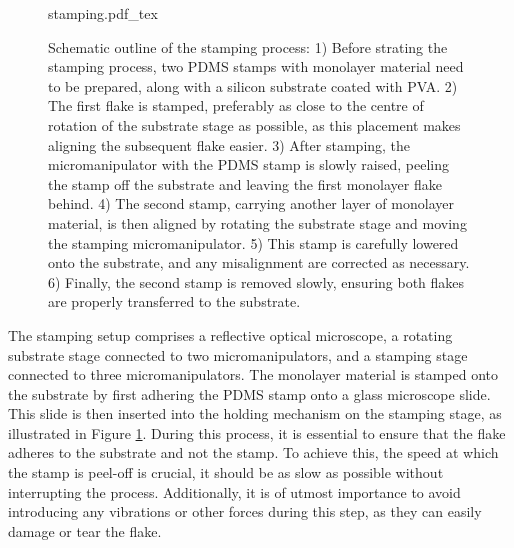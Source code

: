 \begin{figure}[h]
	\centering
	\def\svgwidth{1\linewidth}
	{stamping.pdf_tex}
	\caption{Schematic outline of the stamping process: 1) Before strating the stamping process, two PDMS stamps with monolayer material need to be prepared, along with a silicon substrate coated with PVA.
    2) The first flake is stamped, preferably as close to the centre of rotation of the substrate stage as possible, as this placement makes aligning the subsequent flake easier.
    3) After stamping, the micromanipulator with the PDMS stamp is slowly raised, peeling the stamp off the substrate and leaving the first monolayer flake behind. 
    4) The second stamp, carrying another layer of monolayer material, is then aligned by rotating the substrate stage and moving the stamping micromanipulator. 
    5) This stamp is carefully lowered onto the substrate, and any misalignment are corrected as necessary. 
    6) Finally, the second stamp is removed slowly, ensuring both flakes are properly transferred to the substrate.}
    
\label{fig:stamping_process}
\end{figure}

The stamping setup comprises a reflective optical microscope, a rotating substrate stage connected to two micromanipulators, and a stamping stage connected to three micromanipulators.
%
The monolayer material is stamped onto the substrate by first adhering the PDMS stamp onto a glass microscope slide.
%
This slide is then inserted into the holding mechanism on the stamping stage, as illustrated in Figure \ref{fig:stamping_process}.
%
During this process, it is essential to ensure that the flake adheres to the substrate and not the stamp.
%
To achieve this, the speed at which the stamp is peel-off is crucial, it should be as slow as possible without interrupting the process.
%
Additionally, it is of utmost importance to avoid introducing any vibrations or other forces during this step, as they can easily damage or tear the flake.

